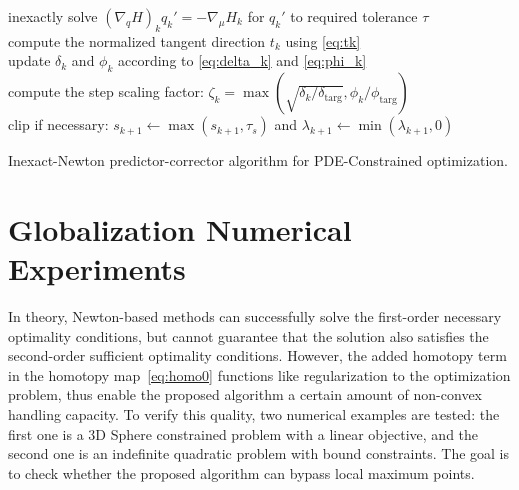 \begin{algorithm}[H]
{  
  \ShowLn
  \ShowLn
   inexactly solve $\left(\nabla_q H\right)_{k} q_{k}' = - \nabla_\mu H_{k}$
  for $q_{k}'$ to required tolerance $\tau$   \label{line:tang} \\
  compute the normalized tangent direction $t_{k}$ using \eqref{eq:tk} \\
  update $\delta_k$ and $\phi_{k}$ according to \eqref{eq:delta_k} and
  \eqref{eq:phi_k} \\
  compute the step scaling factor: $\zeta_{k} = \max\left( \sqrt{\delta_k/\delta_{\text{targ}}}, \phi_k / \phi_{\text{targ}} \right)$\\
  clip if necessary: $s_{k+1} \leftarrow \max(s_{k+1},\tau_s)$ and
  $\lambda_{k+1} \leftarrow \min(\lambda_{k+1},0)$ \\
  }
\caption{Inexact-Newton predictor-corrector algorithm for PDE-Constrained
  optimization.\label{alg:pc}}
\end{algorithm}

\newpage
\section{Globalization Numerical Experiments}
In theory, Newton-based methods can successfully solve the first-order necessary optimality conditions, but cannot guarantee that the solution also satisfies the second-order sufficient optimality conditions. However, the added homotopy term in the homotopy map~\eqref{eq:homo0} functions like regularization to the optimization problem, thus enable the proposed algorithm a certain amount of non-convex handling capacity. To verify this quality, two numerical examples are tested: the first one is a 3D Sphere constrained problem with a linear objective, and the second one is an indefinite quadratic problem with bound constraints. The goal is to check whether the proposed algorithm can bypass local maximum points.  


